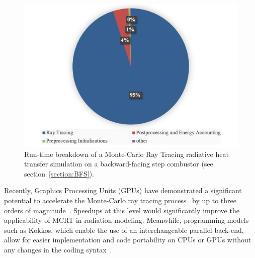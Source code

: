 \begin{figure}
\centering
\includegraphics[width=0.8\linewidth]{figures/ch1/BFS_profiling.png}
\caption{Run-time breakdown of a Monte-Carlo Ray Tracing radiative heat transfer simulation on a backward-facing step combustor (see section~\ref{section:BFS}).}
\label{fig:Sample_Profiling}
\end{figure}


Recently, Graphics Processing Units (GPUs) have demonstrated a significant potential to accelerate the Monte-Carlo ray tracing process~\cite{Howell2021TheTransfer,Humphrey2015ATracing} by up to three orders of magnitude~\cite{Silvestri2019ASimulation}. Speedups at this level would significantly improve the applicability of MCRT in radiation modeling. 
Meanwhile, programming models such as Kokkos, which enable the use of an interchangeable parallel back-end, allow for easier implementation and code portability on CPUs or GPUs without any changes in the coding syntax~\cite{Trott_Kokkos3_2022}.


